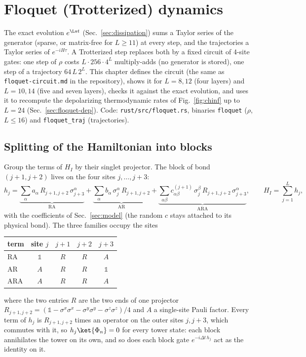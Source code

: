 \section{Floquet (Trotterized) dynamics}
\label{sec:floquet}

The exact evolution $e^{\Lv t}$ (Sec.~\ref{sec:dissipation}) sums a Taylor series of the generator (sparse, or matrix-free for $L \ge 11$) at every step, and the trajectories a Taylor series of $e^{-iH\tau}$. A Trotterized step replaces both by a fixed circuit of 4-site gates: one step of $\rho$ costs $L\cdot 256\cdot 4^L$ multiply-adds (no generator is stored), one step of a trajectory $64\,L\,2^L$. This chapter defines the circuit (the same as \texttt{floquet-circuit.md} in the repository), shows it for $L = 8, 12$ (four layers) and $L = 10, 14$ (five and seven layers), checks it against the exact evolution, and uses it to recompute the depolarizing thermodynamic rates of Fig.~\ref{fig:chinf} up to $L = 24$ (Sec.~\ref{sec:floquet-dep}). Code: \texttt{rust/src/floquet.rs}, binaries \texttt{floquet} ($\rho$, $L \le 16$) and \texttt{floquet\_traj} (trajectories).

\subsection{Splitting of the Hamiltonian into blocks}
\label{sec:floquet-blocks}

Group the terms of $H_I$ by their singlet projector. The block of bond $(j+1, j+2)$ lives on the four sites $j, \dots, j+3$:
\begin{equation}
h_j = \underbrace{\sum_\alpha a_\alpha\, R_{j+1,j+2}\,\sigma^\alpha_{j+3}}_{\mathrm{RA}}
 + \underbrace{\sum_\alpha b_\alpha\, \sigma^\alpha_{j}\,R_{j+1,j+2}}_{\mathrm{AR}}
 + \underbrace{\sum_{\alpha\beta} c^{(j+1)}_{\alpha\beta}\, \sigma^\beta_{j}\,R_{j+1,j+2}\,\sigma^\alpha_{j+3}}_{\mathrm{ARA}},
\qquad H_I = \sum_{j=1}^{L} h_j ,
\label{eq:floquet-block}
\end{equation}
with the coefficients of Sec.~\ref{sec:model} (the random $c$ stays attached to its physical bond). The three families occupy the sites
\begin{center}
\begin{tabular}{lcccc}
\toprule
term & site $j$ & $j+1$ & $j+2$ & $j+3$ \\
\midrule
RA  & $\mathds 1$ & $R$ & $R$ & $A$ \\
AR  & $A$ & $R$ & $R$ & $\mathds 1$ \\
ARA & $A$ & $R$ & $R$ & $A$ \\
\bottomrule
\end{tabular}
\end{center}
where the two entries $R$ are the two ends of one projector $R_{j+1,j+2} = (\mathds 1 - \sigma^x\sigma^x - \sigma^y\sigma^y - \sigma^z\sigma^z)/4$ and $A$ a single-site Pauli factor. Every term of $h_j$ is $R_{j+1,j+2}$ times an operator on the outer sites $j, j+3$, which commutes with it, so $h_j\ket{\Phi_n} = 0$ for every tower state: each block annihilates the tower on its own, and so does each block gate $e^{-i\Delta t\, h_j}$ act as the identity on it.

